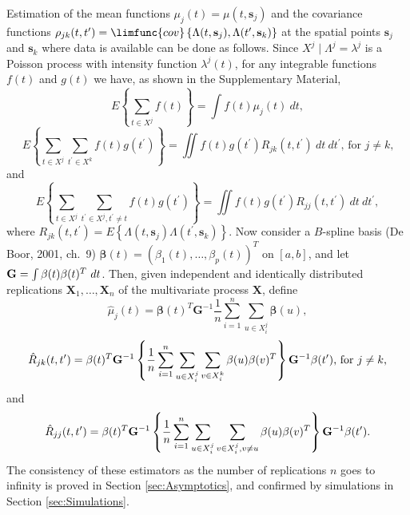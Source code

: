\documentclass[titlepage,12pt]{article}
\begin{document}
Estimation of the mean functions $\mu _{j}(t)=\mu (t,\mathbf{s}_{j})$ and
the covariance functions $\rho _{jk}(t,t^{\prime })=\limfunc{cov}\left\{
\Lambda (t,\mathbf{s}_{j}),\Lambda (t^{\prime },\mathbf{s}_{k})\right\} $ at
the spatial points $\mathbf{s}_{j}$ and $\mathbf{s}_{k}$ where data is
available can be done as follows. Since $X^{j}\mid \Lambda ^{j}=\lambda ^{j}$
is a Poisson process with intensity function $\lambda ^{j}(t)$, for any
integrable functions $f(t)$ and $g(t)$ we have, as shown in the
Supplementary Material, 
\begin{equation}
E\left\{ \sum_{t\in X^{j}}f(t)\right\} =\int f(t)\mu _{j}(t)~dt,
\label{eq:C1}
\end{equation}%
\begin{equation}
E\left\{ \sum_{t\in X^{j}}\sum_{t^{\prime }\in X^{k}}f(t)g(t^{\prime
})\right\} =\iint f(t)g(t^{\prime })R_{jk}(t,t^{\prime })~dt~dt^{\prime }%
\text{, \ for }j\neq k\text{,}  \label{eq:C2}
\end{equation}%
and%
\begin{equation}
E\left\{ \sum_{t\in X^{j}}\sum_{t^{\prime }\in X^{j},t^{\prime }\neq
t}f(t)g(t^{\prime })\right\} =\iint f(t)g(t^{\prime })R_{jj}(t,t^{\prime
})~dt~dt^{\prime },  \label{eq:C3}
\end{equation}%
where $R_{jk}(t,t^{\prime })=E\left\{ \Lambda (t,\mathbf{s}_{j})\Lambda
(t^{\prime },\mathbf{s}_{k})\right\} $. Now consider a $B$-spline basis (De
Boor, 2001, ch.~9) $\mathbf{\beta }(t)=(\beta _{1}(t),\ldots ,\beta
_{p}(t))^{T}$ on $[a,b]$, and let $\mathbf{G}=\int \mathbf{\beta }(t)\mathbf{%
\beta }(t)^{T}~dt$. Then, given independent and identically distributed
replications $\mathbf{X}_{1},\ldots ,\mathbf{X}_{n}$ of the multivariate
process $\mathbf{X}$, define 
\begin{equation}
\hat{\mu}_{j}(t)=\mathbf{\beta }(t)^{T}\mathbf{G}^{-1}\frac{1}{n}%
\sum_{i=1}^{n}\sum_{u\in X_{i}^{j}}\mathbf{\beta }(u),  \label{eq:mu_hat}
\end{equation}%
\begin{equation}
\hat{R}_{jk}(t,t^{\prime })=\mathbf{\beta }(t)^{T}\mathbf{G}^{-1}\left\{ 
\frac{1}{n}\sum_{i=1}^{n}\sum_{u\in X_{i}^{j}}\sum_{v\in X_{i}^{k}}\mathbf{%
\beta }(u)\mathbf{\beta }(v)^{T}\right\} \mathbf{G}^{-1}\mathbf{\beta }%
(t^{\prime })\text{, for }j\neq k\text{,}  \label{eq:R_hat_jk}
\end{equation}%
and 
\begin{equation}
\hat{R}_{jj}(t,t^{\prime })=\mathbf{\beta }(t)^{T}\mathbf{G}^{-1}\left\{ 
\frac{1}{n}\sum_{i=1}^{n}\sum_{u\in X_{i}^{j}}\sum_{v\in X_{i}^{j},v\neq u}%
\mathbf{\beta }(u)\mathbf{\beta }(v)^{T}\right\} \mathbf{G}^{-1}\mathbf{%
\beta }(t^{\prime }).  \label{eq:R_hat_jj}
\end{equation}%
The consistency of these estimators as the number of replications $n$ goes
to infinity is proved in Section \ref{sec:Asymptotics}, and confirmed by
simulations in Section \ref{sec:Simulations}.
\end{document}
